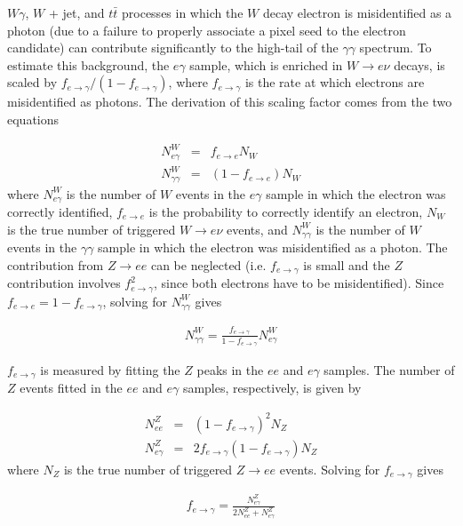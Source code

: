 \documentclass[dissertation.tex]{subfiles}
\begin{document}
$W\gamma$, $W$ + jet, and $t\bar{t}$ processes in which the $W$ decay electron is misidentified as a photon (due to a failure to properly associate a pixel seed to the electron candidate) can contribute significantly to the high-\MET tail of the $\gamma\gamma$ \MET spectrum.  To estimate this background, the $e\gamma$ sample, which is enriched in $W\rightarrow e\nu$ decays, is scaled by $f_{e\rightarrow\gamma}/(1 - f_{e\rightarrow\gamma})$, where $f_{e\rightarrow\gamma}$ is the rate at which electrons are misidentified as photons.  The derivation of this scaling factor comes from the two equations

\begin{eqnarray}
N_{e\gamma}^{W} &=& f_{e\rightarrow e}N_{W}\\
N_{\gamma\gamma}^{W} &=& (1 - f_{e\rightarrow e})N_{W}
\end{eqnarray}
%
where $N_{e\gamma}^{W}$ is the number of $W$ events in the $e\gamma$ sample in which the electron was correctly identified, $f_{e\rightarrow e}$ is the probability to correctly identify an electron, $N_{W}$ is the true number of triggered $W\rightarrow e\nu$ events, and $N_{\gamma\gamma}^{W}$ is the number of $W$ events in the $\gamma\gamma$ sample in which the electron was misidentified as a photon.  The contribution from $Z\rightarrow ee$ can be neglected (i.e. $f_{e\rightarrow\gamma}$ is small and the $Z$ contribution involves $f_{e\rightarrow\gamma}^{2}$, since both electrons have to be misidentified).  Since $f_{e\rightarrow e} = 1 - f_{e\rightarrow\gamma}$, solving for $N_{\gamma\gamma}^{W}$ gives

\begin{eqnarray}
N_{\gamma\gamma}^{W} = \frac{f_{e\rightarrow\gamma}}{1 - f_{e\rightarrow\gamma}}N_{e\gamma}^{W}
\end{eqnarray}

$f_{e\rightarrow\gamma}$ is measured by fitting the $Z$ peaks in the $ee$ and $e\gamma$ samples.  The number of $Z$ events fitted in the $ee$ and $e\gamma$ samples, respectively, is given by

\begin{eqnarray}
N_{ee}^{Z} &=& (1 - f_{e\rightarrow\gamma})^{2}N_{Z} \\
N_{e\gamma}^{Z} &=& 2f_{e\rightarrow\gamma}(1 - f_{e\rightarrow\gamma})N_{Z}
\end{eqnarray}
%
where $N_{Z}$ is the true number of triggered $Z\rightarrow ee$ events.  Solving for $f_{e\rightarrow\gamma}$ gives

\begin{eqnarray}
f_{e\rightarrow\gamma} = \frac{N_{e\gamma}^{Z}}{2N_{ee}^{Z} + N_{e\gamma}^{Z}}
\label{eq:feg}
\end{eqnarray}
\end{document}
